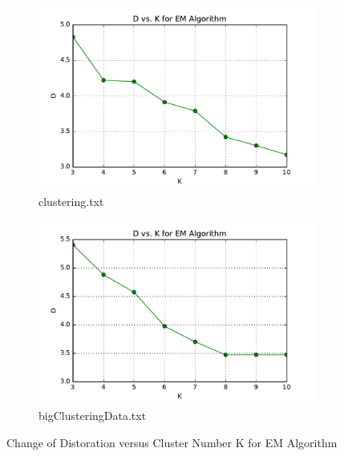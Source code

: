 \begin{figure}[H]
\centering
\centering
        \begin{subfigure}[b]{0.49\textwidth}
            \centering
            \includegraphics[width=\textwidth]{./figures/loss_clustering_EM.pdf}
            \caption{clustering.txt}\label{fig:15a}
        \end{subfigure}
        \hfill
        \begin{subfigure}[b]{0.49\textwidth}  
            \centering 
            \includegraphics[width=\textwidth]{./figures/loss_bigClustering_EM.pdf}
            \caption{bigClusteringData.txt}\label{fig:15b}
        \end{subfigure}
\caption{Change of Distoration versus Cluster Number K for EM Algorithm}
\label{fig:k-means-loss} 
\end{figure}





